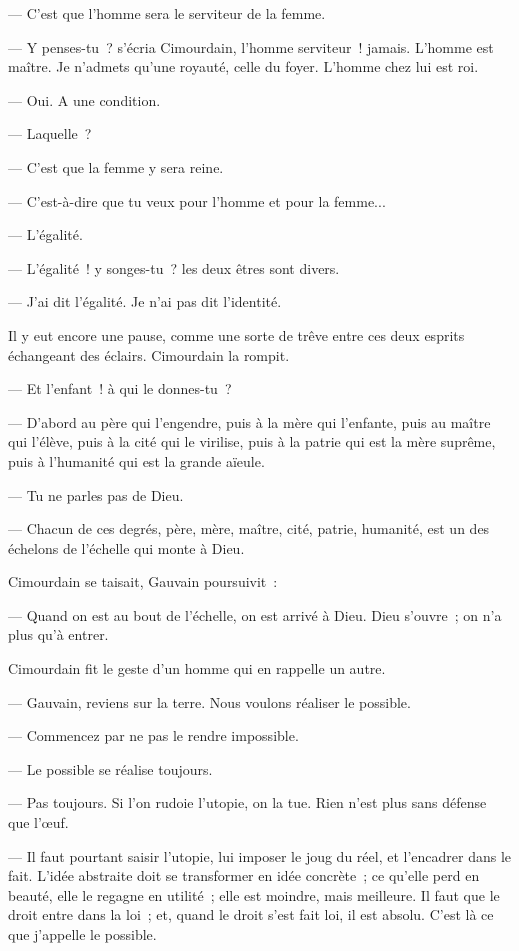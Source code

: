 \documentclass[french,twoside]{book} %
\begin{document}
— C’est que l’homme sera le serviteur de la femme.\par
— Y penses-tu ? s’écria Cimourdain, l’homme serviteur ! jamais. L’homme est maître. Je n’admets qu’une royauté, celle du foyer. L’homme chez lui est roi.\par
— Oui. A une condition.\par
— Laquelle ?\par
— C’est que la femme y sera reine.\par
— C’est-à-dire que tu veux pour l’homme et pour la femme...\par
— L’égalité.\par
— L’égalité ! y songes-tu ? les deux êtres sont divers.\par
— J’ai dit l’égalité. Je n’ai pas dit l’identité.\par
Il y eut encore une pause, comme une sorte de trêve entre ces deux esprits échangeant des éclairs. Cimourdain la rompit.\par
— Et l’enfant ! à qui le donnes-tu ?\par
— D’abord au père qui l’engendre, puis à la mère qui l’enfante, puis au maître qui l’élève, puis à la cité qui le virilise, puis à la patrie qui est la mère suprême, puis à l’humanité qui est la grande aïeule.\par
 — Tu ne parles pas de Dieu.\par
— Chacun de ces degrés, père, mère, maître, cité, patrie, humanité, est un des échelons de l’échelle qui monte à Dieu.\par
Cimourdain se taisait, Gauvain poursuivit :\par
— Quand on est au bout de l’échelle, on est arrivé à Dieu. Dieu s’ouvre ; on n’a plus qu’à entrer.\par
Cimourdain fit le geste d’un homme qui en rappelle un autre.\par
— Gauvain, reviens sur la terre. Nous voulons réaliser le possible.\par
— Commencez par ne pas le rendre impossible.\par
— Le possible se réalise toujours.\par
— Pas toujours. Si l’on rudoie l’utopie, on la tue. Rien n’est plus sans défense que l’œuf.\par
— Il faut pourtant saisir l’utopie, lui imposer le joug du réel, et l’encadrer dans le fait. L’idée abstraite doit se transformer en idée concrète ; ce qu’elle perd en beauté, elle le regagne en utilité ; elle est moindre, mais meilleure. Il faut que le droit entre dans la loi ; et, quand le droit s’est fait loi, il est absolu. C’est là ce que j’appelle le possible.\par
\end{document}
